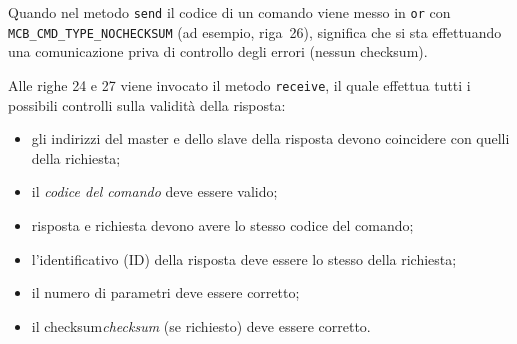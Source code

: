 Quando nel metodo \texttt{send} il codice di un comando viene messo in \texttt{or} con 
\texttt{MCB\_CMD\_TYPE\_NOCHECKSUM} (ad esempio, riga~26), significa che si sta effettuando
una comunicazione priva di controllo degli errori (nessun checksum).

Alle righe 24 e 27 viene invocato il metodo \texttt{receive}, il quale effettua tutti i 
possibili controlli sulla validit\`a della risposta:
\begin{itemize}
\item gli indirizzi del master e dello slave della risposta devono coincidere con quelli della
richiesta;
\item il \emph{codice del comando} deve essere valido;
\item risposta e richiesta devono avere lo stesso codice del comando;
\item l'identificativo (ID) della risposta deve essere lo stesso della richiesta;
\item il numero di parametri deve essere corretto;
\item il checksum\emph{checksum} (se richiesto) deve essere corretto.
\end{itemize}
